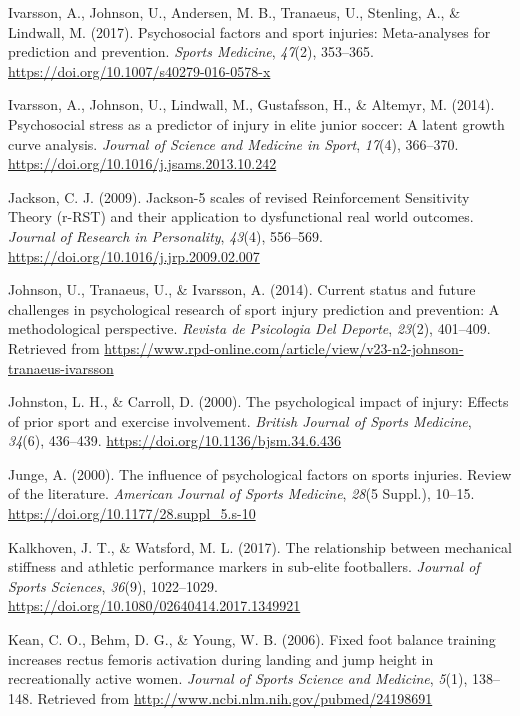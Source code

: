 \documentclass[
  english,
  man,floatsintext]{apa6}
\begin{document}
\leavevmode\hypertarget{ref-Ivarsson2017}{}%
Ivarsson, A., Johnson, U., Andersen, M. B., Tranaeus, U., Stenling, A., \& Lindwall, M. (2017). Psychosocial factors and sport injuries: Meta-analyses for prediction and prevention. \emph{Sports Medicine}, \emph{47}(2), 353--365. \url{https://doi.org/10.1007/s40279-016-0578-x}

\leavevmode\hypertarget{ref-Ivarsson2014}{}%
Ivarsson, A., Johnson, U., Lindwall, M., Gustafsson, H., \& Altemyr, M. (2014). Psychosocial stress as a predictor of injury in elite junior soccer: A latent growth curve analysis. \emph{Journal of Science and Medicine in Sport}, \emph{17}(4), 366--370. \url{https://doi.org/10.1016/j.jsams.2013.10.242}

\leavevmode\hypertarget{ref-Jackson2009}{}%
Jackson, C. J. (2009). Jackson-5 scales of revised Reinforcement Sensitivity Theory (r-RST) and their application to dysfunctional real world outcomes. \emph{Journal of Research in Personality}, \emph{43}(4), 556--569. \url{https://doi.org/10.1016/j.jrp.2009.02.007}

\leavevmode\hypertarget{ref-Johnson2014}{}%
Johnson, U., Tranaeus, U., \& Ivarsson, A. (2014). Current status and future challenges in psychological research of sport injury prediction and prevention: A methodological perspective. \emph{Revista de Psicologia Del Deporte}, \emph{23}(2), 401--409. Retrieved from \url{https://www.rpd-online.com/article/view/v23-n2-johnson-tranaeus-ivarsson}

\leavevmode\hypertarget{ref-Johnston2000}{}%
Johnston, L. H., \& Carroll, D. (2000). The psychological impact of injury: Effects of prior sport and exercise involvement. \emph{British Journal of Sports Medicine}, \emph{34}(6), 436--439. \url{https://doi.org/10.1136/bjsm.34.6.436}

\leavevmode\hypertarget{ref-Junge2000}{}%
Junge, A. (2000). The influence of psychological factors on sports injuries. Review of the literature. \emph{American Journal of Sports Medicine}, \emph{28}(5 Suppl.), 10--15. \url{https://doi.org/10.1177/28.suppl_5.s-10}

\leavevmode\hypertarget{ref-Kalkhoven2018}{}%
Kalkhoven, J. T., \& Watsford, M. L. (2017). The relationship between mechanical stiffness and athletic performance markers in sub-elite footballers. \emph{Journal of Sports Sciences}, \emph{36}(9), 1022--1029. \url{https://doi.org/10.1080/02640414.2017.1349921}

\leavevmode\hypertarget{ref-Kean2006}{}%
Kean, C. O., Behm, D. G., \& Young, W. B. (2006). Fixed foot balance training increases rectus femoris activation during landing and jump height in recreationally active women. \emph{Journal of Sports Science and Medicine}, \emph{5}(1), 138--148. Retrieved from \url{http://www.ncbi.nlm.nih.gov/pubmed/24198691}
\end{document}
